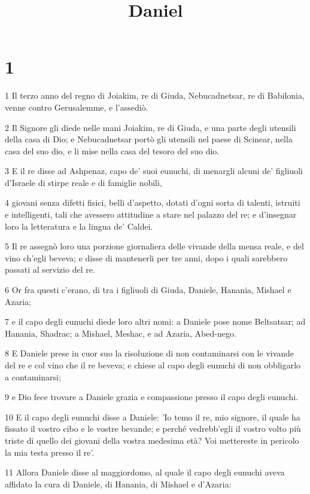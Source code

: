 

\title{Daniel}


\chapter{1}

\par 1 Il terzo anno del regno di Joiakim, re di Giuda, Nebucadnetsar, re di Babilonia, venne contro Gerusalemme, e l'assediò.
\par 2 Il Signore gli diede nelle mani Joiakim, re di Giuda, e una parte degli utensili della casa di Dio; e Nebucadnetsar portò gli utensili nel paese di Scinear, nella casa del suo dio, e li mise nella casa del tesoro del suo dio.
\par 3 E il re disse ad Ashpenaz, capo de' suoi eunuchi, di menargli alcuni de' figliuoli d'Israele di stirpe reale e di famiglie nobili,
\par 4 giovani senza difetti fisici, belli d'aspetto, dotati d'ogni sorta di talenti, istruiti e intelligenti, tali che avessero attitudine a stare nel palazzo del re; e d'insegnar loro la letteratura e la lingua de' Caldei.
\par 5 Il re assegnò loro una porzione giornaliera delle vivande della mensa reale, e del vino ch'egli beveva; e disse di mantenerli per tre anni, dopo i quali sarebbero passati al servizio del re.
\par 6 Or fra questi c'erano, di tra i figliuoli di Giuda, Daniele, Hanania, Mishael e Azaria;
\par 7 e il capo degli eunuchi diede loro altri nomi: a Daniele pose nome Beltsatsar; ad Hanania, Shadrac; a Mishael, Meshac, e ad Azaria, Abed-nego.
\par 8 E Daniele prese in cuor suo la risoluzione di non contaminarsi con le vivande del re e col vino che il re beveva; e chiese al capo degli eunuchi di non obbligarlo a contaminarsi;
\par 9 e Dio fece trovare a Daniele grazia e compassione presso il capo degli eunuchi.
\par 10 E il capo degli eunuchi disse a Daniele: 'Io temo il re, mio signore, il quale ha fissato il vostro cibo e le vostre bevande; e perché vedrebb'egli il vostro volto più triste di quello dei giovani della vostra medesima età? Voi mettereste in pericolo la mia testa presso il re'.
\par 11 Allora Daniele disse al maggiordomo, al quale il capo degli eunuchi aveva affidato la cura di Daniele, di Hanania, di Mishael e d'Azaria:
